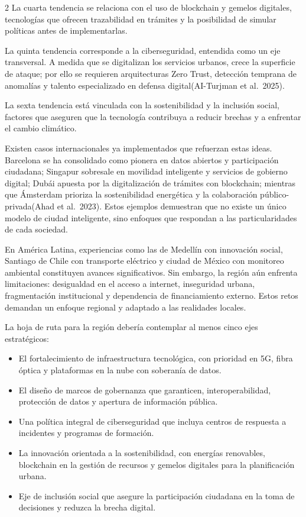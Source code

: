 \documentclass[12pt,spanish,Letterpaper,openany]{book}
\providecommand{\tightlist}{%
  \setlength{\itemsep}{0pt}\setlength{\parskip}{0pt}}
\begin{document}
\begin {multicols}{2}
La cuarta tendencia se relaciona con el uso de blockchain y gemelos digitales, tecnologías que ofrecen trazabilidad en trámites y la posibilidad de simular políticas antes de implementarlas.

La quinta tendencia corresponde a la ciberseguridad, entendida como un eje transversal. A medida que se digitalizan los servicios urbanos, crece la superficie de ataque; por ello se requieren arquitecturas Zero Trust, detección temprana de anomalías y talento especializado en defensa digital(AI-Turjman et al.~2025).

La sexta tendencia está vinculada con la sostenibilidad y la inclusión social, factores que aseguren que la tecnología contribuya a reducir brechas y a enfrentar el cambio climático.

Existen casos internacionales ya implementados que refuerzan estas ideas. Barcelona se ha consolidado como pionera en datos abiertos y participación ciudadana; Singapur sobresale en movilidad inteligente y servicios de gobierno digital; Dubái apuesta por la digitalización de trámites con blockchain; mientras que Ámsterdam prioriza la sostenibilidad energética y la colaboración público-privada(Ahad et al.~2023). Estos ejemplos demuestran que no existe un único modelo de ciudad inteligente, sino enfoques que respondan a las particularidades de cada sociedad.

En América Latina, experiencias como las de Medellín con innovación social, Santiago de Chile con transporte eléctrico y ciudad de México con monitoreo ambiental constituyen avances significativos. Sin embargo, la región aún enfrenta limitaciones: desigualdad en el acceso a internet, inseguridad urbana, fragmentación institucional y dependencia de financiamiento externo. Estos retos demandan un enfoque regional y adaptado a las realidades locales.

La hoja de ruta para la región debería contemplar al menos cinco ejes estratégicos:

\begin{itemize}
\tightlist
\item
  El fortalecimiento de infraestructura tecnológica, con prioridad en 5G, fibra óptica y plataformas en la nube con soberanía de datos.
\item
  El diseño de marcos de gobernanza que garanticen, interoperabilidad, protección de datos y apertura de información pública.
\item
  Una política integral de ciberseguridad que incluya centros de respuesta a incidentes y programas de formación.
\item
  La innovación orientada a la sostenibilidad, con energías renovables, blockchain en la gestión de recursos y gemelos digitales para la planificación urbana.
\item
  Eje de inclusión social que asegure la participación ciudadana en la toma de decisiones y reduzca la brecha digital.
\end{itemize}


\end{multicols}
\end{document}
